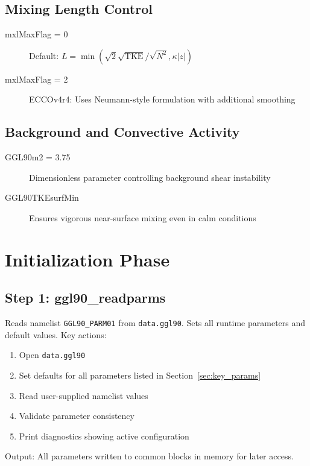 \documentclass[11pt, a4paper]{article}
\begin{document}
\subsection{Mixing Length Control}

\begin{description}
    \item[mxlMaxFlag = 0] Default: $L = \min(\sqrt{2}\sqrt{\text{TKE}}/\sqrt{N^2}, \kappa|z|)$
    \item[mxlMaxFlag = 2] ECCOv4r4: Uses Neumann-style formulation with additional smoothing
\end{description}

\subsection{Background and Convective Activity}

\begin{description}
    \item[GGL90m2 = 3.75] Dimensionless parameter controlling background shear instability
    \item[GGL90TKEsurfMin] Ensures vigorous near-surface mixing even in calm conditions
\end{description}

\section{Initialization Phase}

\subsection{Step 1: ggl90\_readparms}

Reads namelist \texttt{GGL90\_PARM01} from \texttt{data.ggl90}. Sets all runtime parameters and default values. Key actions:

\begin{enumerate}
    \item Open \texttt{data.ggl90}
    \item Set defaults for all parameters listed in Section~\ref{sec:key_params}
    \item Read user-supplied namelist values
    \item Validate parameter consistency
    \item Print diagnostics showing active configuration
\end{enumerate}

Output: All parameters written to common blocks in memory for later access.
\end{document}
